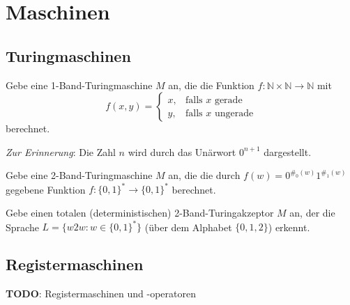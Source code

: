 \documentclass[german,headsepline]{scrartcl}
\theoremstyle{definition}
\begin{document}
	\section{Maschinen}
	
	\subsection{Turingmaschinen}
	\begin{question}[subtitle={Klausur 2012}]
		Gebe eine 1-Band-Turingmaschine $M$ an,
		die die Funktion $f:\mathbb{N}\times\mathbb{N}\to\mathbb{N}$ mit
		\[f(x,y)=\begin{cases}
			x, &\text{falls $x$ gerade} \\
			y, &\text{falls $x$ ungerade}
		\end{cases}\]
		berechnet.
		
		\textit{Zur Erinnerung}: Die Zahl $n$ wird durch das Unärwort $0^{n+1}$ dargestellt.
	\end{question}
	
	\begin{question}[subtitle={Klausur 2014}]
		Gebe eine 2-Band-Turingmaschine $M$ an, die die durch $f(w)=0^{\#_0(w)}1^{\#_1(w)}$ gegebene Funktion $f:\{0,1\}^*\to\{0,1\}^*$ berechnet.
	\end{question}
	
	\begin{question}[subtitle={Klausur 2015}]
		Gebe einen totalen (deterministischen) 2-Band-Turingakzeptor $M$ an,
		der die Sprache $L=\{w2w\colon w\in\{0,1\}^*\}$ (über dem Alphabet $\{0,1,2\}$) erkennt.
	\end{question}
	
	\subsection{Registermaschinen}
	\begin{question}
		
	\end{question}
	
	\textbf{TODO}: Registermaschinen und -operatoren
	
\end{document}
